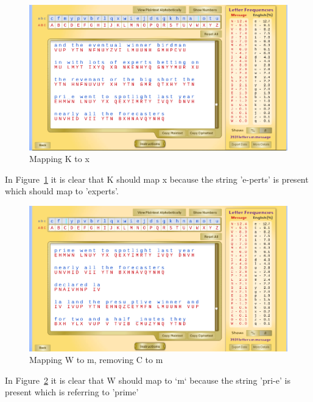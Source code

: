 \documentclass[12pt]{article}
\begin{document}
\begin{figure}[H]
    \begin{center}
        \includegraphics[scale=0.48]{c18.png}
    \end{center}{}
    \caption{Mapping K to x}
    \label{fig:c18}
\end{figure}

In Figure~\ref{fig:c18} it is clear that K should map x because the string 'e-perts' is present which should map to 'experts'.

\begin{figure}[H]
    \begin{center}
        \includegraphics[scale=0.48]{c19.png}
    \end{center}{}
    \caption{Mapping W to m, removing C to m}
    \label{fig:c19}
\end{figure}

In Figure~\ref{fig:c19} it is clear that W should map to `m` because the string 'pri-e' is present which is referring to 'prime'
\end{document}
